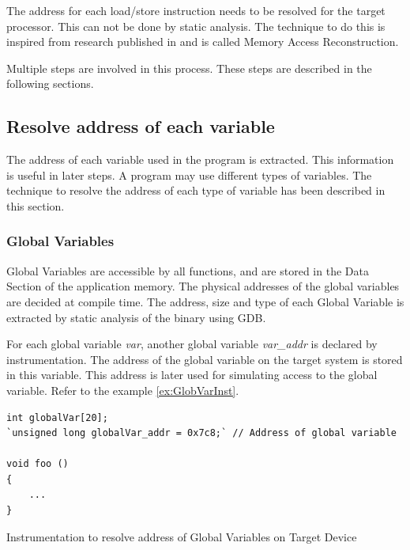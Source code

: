The address for each load/store instruction needs to be resolved for the target processor. This can not be done by static analysis. The technique to do this is inspired from research published in \cite{Lu2013} and is called Memory Access Reconstruction. 

Multiple steps are involved in this process. These steps are described in the following sections.

%

\subsection{Resolve address of each variable}
The address of each variable used in the program is extracted. This information is useful in later steps. A program may use different types of variables. The technique to resolve the address of each type of variable has been described in this section.

\subsubsection{Global Variables}
Global Variables are accessible by all functions, and are stored in the Data Section of the application memory. The physical addresses of the global variables are decided at compile time. The address, size and type of each Global Variable is extracted by static analysis of the binary using GDB. 

For each global variable \emph{var}, another global variable \emph{var\_addr} is declared by instrumentation. The address of the global variable on the target system is stored in this variable. This address is later used for simulating access to the global variable. Refer to the example \ref{ex:GlobVarInst}.

\vspace*{10pt}
\begin{Example}
\begin{lstlisting}
int globalVar[20];
`unsigned long globalVar_addr = 0x7c8;` // Address of global variable

void foo ()
{
    ...
}
\end{lstlisting}
\caption{Instrumentation to resolve address of Global Variables on Target Device}
\label{ex:GlobVarInst}
\end{Example}

